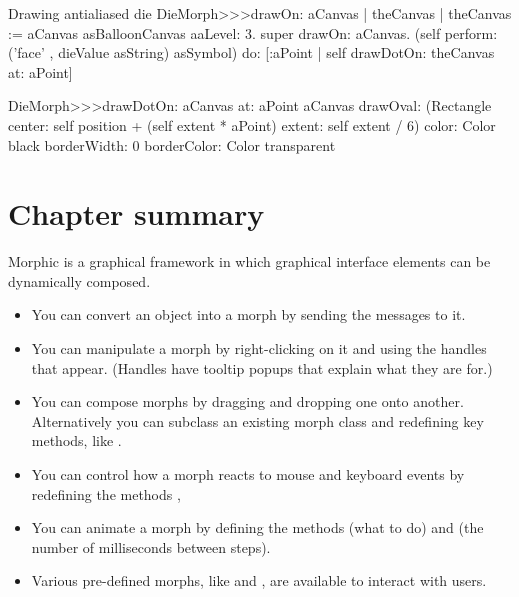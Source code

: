 \documentclass[a4paper,10pt,twoside]{book}
\begin{document}
\begin{methods}[aadie]{Drawing antialiased die}
DieMorph>>>drawOn: aCanvas
   | theCanvas |
   theCanvas := aCanvas asBalloonCanvas aaLevel: 3.
   super drawOn: aCanvas.
   (self perform: ('face' , dieValue asString) asSymbol)
      do: [:aPoint | self drawDotOn: theCanvas at: aPoint]

DieMorph>>>drawDotOn: aCanvas at: aPoint
   aCanvas
      drawOval: (Rectangle
         center: self position + (self extent * aPoint)
         extent: self extent / 6)
      color: Color black
      borderWidth: 0
      borderColor: Color transparent
\end{methods}

\section{Chapter summary}

Morphic is a graphical framework in which graphical interface elements can be dynamically composed.

\begin{itemize}
  \item You can convert an object into a morph by sending the messages  to it.
  \item You can manipulate a morph by right-clicking on it and using the handles that appear. (Handles have tooltip popups that explain what they are for.)
  \item You can compose morphs by dragging and dropping one onto another.
  Alternatively you can subclass an existing morph class and redefining key methods, like .
  \item You can control how a morph reacts to mouse and keyboard events by redefining the methods , \etc
  \item You can animate a morph by defining the methods  (what to do) and  (the number of milliseconds between steps).
  \item Various pre-defined morphs, like  and , are available to interact with users.
\end{itemize}

\ifx\wholebook\relax\else
\end{document}
